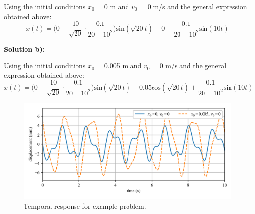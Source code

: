\documentclass[12pt,letter]{article}
\begin{document}
\begin{example}
	\noindent Using the initial conditions $x_0$ = 0 m and $v_0$ = 0 m/s and the general expression obtained above:
	\begin{equation}
		x(t) = \Big(0-\frac{10}{\sqrt{20}}\cdot \frac{0.1}{20-10^2}\Big)\text{sin}(\sqrt{20} t) + 0 + \frac{0.1}{20-10^2}\text{sin}(10 t)
	\end{equation}			

	\noindent\textbf{Solution b):} 

	\noindent Using the initial conditions $x_0$ = 0.005 m and $v_0$ = 0 m/s and the general expression obtained above:
	\begin{equation}
		x(t) = \Big(0-\frac{10}{\sqrt{20}}\cdot \frac{0.1}{20-10^2}\Big)\text{sin}(\sqrt{20} t) + 0.05\text{cos}(\sqrt{20} t) + \frac{0.1}{20-10^2}\text{sin}(10 t)
	\end{equation}			
	\begin{figure}[H]
		\centering
		\includegraphics[width=1.0\textwidth]{../figures/response_1-DOF-spring_mass_forced.png}
		\caption{Temporal response for example problem.}
	\end{figure}
\end{example}
\end{document}
